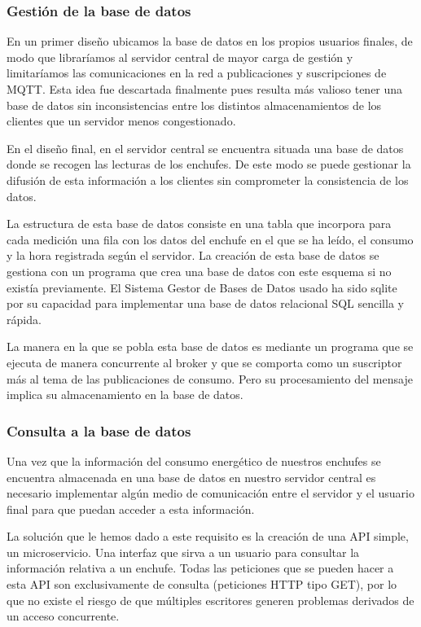 \documentclass[a4paper,10pt]{article}
\begin{document}
\subsubsection{Gestión de la base de datos}

En un primer diseño ubicamos la base de datos en los propios usuarios
finales, de modo que libraríamos al servidor central de mayor carga de
gestión y limitaríamos las comunicaciones en la red a publicaciones y
suscripciones de MQTT. Esta idea fue descartada finalmente pues
resulta más valioso tener una base de datos sin inconsistencias entre
los distintos almacenamientos de los clientes que un servidor menos
congestionado.

En el diseño final, en el servidor central se encuentra situada una
base de datos donde se recogen las lecturas de los enchufes. De este
modo se puede gestionar la difusión de esta información a los clientes
sin comprometer la consistencia de los datos.

La estructura de esta base de datos consiste en una tabla que
incorpora para cada medición una fila con los datos del enchufe en el
que se ha leído, el consumo y la hora registrada según el servidor. La
creación de esta base de datos se gestiona con un programa que crea
una base de datos con este esquema si no existía previamente. El
Sistema Gestor de Bases de Datos usado ha sido
sqlite\cite{SQLiteHomePage} por su capacidad para implementar una base
de datos relacional SQL sencilla y rápida.

La manera en la que se pobla esta base de datos es mediante un
programa que se ejecuta de manera concurrente al broker y que se
comporta como un suscriptor más al tema de las publicaciones de
consumo. Pero su procesamiento del mensaje implica su almacenamiento
en la base de datos.

\subsubsection{Consulta a la base de datos}\label{subsubsec:consulta-api}

Una vez que la información del consumo energético de nuestros enchufes
se encuentra almacenada en una base de datos en nuestro servidor
central es necesario implementar algún medio de comunicación entre el
servidor y el usuario final para que puedan acceder a esta
información.

La solución que le hemos dado a este requisito es la creación de una
API simple, un microservicio. Una interfaz que sirva a un usuario para
consultar la información relativa a un enchufe. Todas las peticiones
que se pueden hacer a esta API son exclusivamente de consulta
(peticiones HTTP tipo GET), por lo que no existe el riesgo de que
múltiples escritores generen problemas derivados de un acceso
concurrente.
\end{document}
